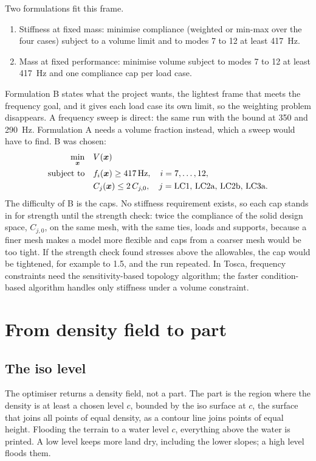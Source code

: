 Two formulations fit this frame.
\begin{enumerate}
\item[(A)] Stiffness at fixed mass: minimise compliance (weighted or min-max over the four cases) subject to a volume limit and to modes 7 to 12 at least \SI{417}{Hz}.
\item[(B)] Mass at fixed performance: minimise volume subject to modes 7 to 12 at least \SI{417}{Hz} and one compliance cap per load case.
\end{enumerate}
Formulation B states what the project wants, the lightest frame that meets the frequency goal, and it gives each load case its own limit, so the weighting problem disappears. A frequency sweep is direct: the same run with the bound at 350 and \SI{290}{Hz}. Formulation A needs a volume fraction instead, which a sweep would have to find. B was chosen:
\begin{align}
\min_{\boldsymbol{x}} \quad & V(\boldsymbol{x}) \nonumber\\
\text{subject to} \quad & f_i(\boldsymbol{x}) \geq \SI{417}{Hz}, \quad i = 7,\dots,12, \label{eq:to-formulation}\\
& C_j(\boldsymbol{x}) \leq 2\,C_{j,0}, \quad j = \text{LC1, LC2a, LC2b, LC3a}. \nonumber
\end{align}
The difficulty of B is the caps. No stiffness requirement exists, so each cap stands in for strength until the strength check: twice the compliance of the solid design space, $C_{j,0}$, on the same mesh, with the same ties, loads and supports, because a finer mesh makes a model more flexible and caps from a coarser mesh would be too tight. If the strength check found stresses above the allowables, the cap would be tightened, for example to 1.5, and the run repeated. In Tosca, frequency constraints need the sensitivity-based topology algorithm; the faster condition-based algorithm handles only stiffness under a volume constraint.

\section{From density field to part}\label{sec:to-part}

\subsection{The iso level}

The optimiser returns a density field, not a part. The part is the region where the density is at least a chosen level $c$, bounded by the iso surface at $c$, the surface that joins all points of equal density, as a contour line joins points of equal height. Flooding the terrain to a water level $c$, everything above the water is printed. A low level keeps more land dry, including the lower slopes; a high level floods them.


